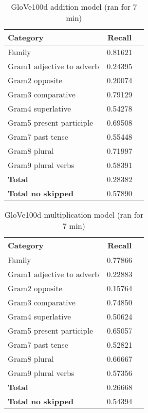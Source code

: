 \begin{center}
    
    \begin{table}[h!]
        \begin{tabular}{| l | c | r}
        	\hline
        	\textbf{Category} &    \textbf{Recall}\\ \hline
        	Family 						& 0.81621 \\
        	Gram1 adjective to adverb 	& 0.24395 \\
        	Gram2 opposite 				& 0.20074 \\
        	Gram3 comparative 			& 0.79129 \\
        	Gram4 superlative 			& 0.54278 \\
        	Gram5 present participle	& 0.69508 \\
        	Gram7 past tense 			& 0.55448 \\
        	Gram8 plural 				& 0.71997 \\
        	Gram9 plural verbs 			& 0.58391 \\
        	\textbf{Total}				& 0.28382 \\
        	\textbf{Total no skipped}	& 0.57890 \\ \hline
        \end{tabular}
    \caption{GloVe100d addition model (ran for 7 min)}
    \label{table:glove100d_addition}
    \end{table}
    
    \begin{table}[h!]
        \begin{tabular}{| l | c | r}
        	\hline
        	\textbf{Category} &    \textbf{Recall}\\ \hline
        	Family 						& 0.77866 \\
        	Gram1 adjective to adverb 	& 0.22883 \\
        	Gram2 opposite 				& 0.15764 \\
        	Gram3 comparative 			& 0.74850 \\
        	Gram4 superlative 			& 0.50624 \\
        	Gram5 present participle	& 0.65057 \\
        	Gram7 past tense 			& 0.52821 \\
        	Gram8 plural 				& 0.66667 \\
        	Gram9 plural verbs 			& 0.57356 \\
        	\textbf{Total}				& 0.26668 \\
        	\textbf{Total no skipped}	& 0.54394 \\ \hline
        \end{tabular}
    \caption{GloVe100d multiplication model (ran for 7 min)}
    \label{table:glove100d_addition}
    \end{table}
    

\end{center}

